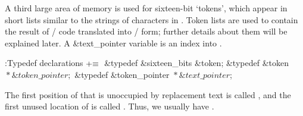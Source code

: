 A third large area of memory is used for sixteen-bit `tokens', which
appear
in short lists similar to the strings of characters in .
Token lists
are used to contain the result of \CEE/ code translated into \TEX/ form;
further details about them will be explained later. A \&{text\_pointer}
variable is an index into .

\Y\B\4:Typedef declarations\X${}\mathrel+\equiv{}$\6
\&{typedef} \&{sixteen\_bits} \&{token};\6
\&{typedef} \&{token} ${}{*}\&{token\_pointer};{}$\6
\&{typedef} \&{token\_pointer} ${}{*}\&{text\_pointer}{}$;\par
\fi

The first position of 
that is unoccupied by replacement text is called , and the
first
unused location of  is called .
Thus, we usually have .

